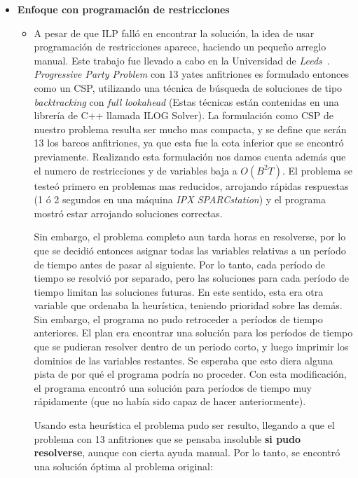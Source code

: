 \documentclass[letter, 10pt]{article}
\begin{document}
\begin{itemize}
\item \textbf{Enfoque con programación de restricciones}
\begin{itemize}
\item A pesar de que ILP falló en encontrar la solución, la idea de usar programación de restricciones aparece, haciendo un pequeño arreglo manual. Este trabajo fue llevado a cabo en la Universidad de \textit{Leeds}~\cite{Smith1996}. \textit{Progressive Party Problem} con 13 yates anfitriones es formulado entonces como un CSP, utilizando una técnica de búsqueda de soluciones de tipo \textit{backtracking} con \textit{full lookahead} (Estas técnicas están contenidas en una librería de C++ llamada ILOG Solver).
La formulación como CSP de nuestro problema resulta ser mucho mas compacta, y se define que serán 13 los barcos anfitriones, ya que esta fue la cota inferior que se encontró previamente. Realizando esta formulación nos damos cuenta además que el numero de restricciones y de variables baja a $O(B^2T)$. El problema se testeó primero en problemas mas reducidos, arrojando rápidas respuestas (1 ó 2 segundos en una máquina \textit{IPX SPARCstation}) y el programa mostró estar arrojando soluciones correctas.

Sin embargo, el problema completo aun  tarda horas en resolverse, por lo que se decidió entonces asignar todas las variables relativas a un período de tiempo antes de pasar al siguiente. Por lo tanto, cada período de tiempo se resolvió por separado, pero las soluciones para cada período de tiempo limitan las soluciones futuras. En este sentido, esta era otra variable que ordenaba la heurística, teniendo prioridad sobre las demás. Sin embargo, el programa no pudo retroceder a períodos de tiempo anteriores. El plan era encontrar una solución para los períodos de tiempo que se pudieran resolver dentro de un periodo corto, y luego imprimir los dominios de las variables restantes. Se esperaba que esto diera alguna pista de por qué el programa podría no proceder. Con esta modificación, el programa encontró una solución para períodos de tiempo muy rápidamente (que no había sido capaz de hacer anteriormente).

Usando esta heurística el problema pudo ser resulto, llegando a que el problema con 13 anfitriones que se pensaba insoluble \textbf{si pudo resolverse}, aunque con cierta ayuda manual. Por lo tanto, se encontró una solución óptima al problema original:


\end{itemize}
\end{itemize}
\end{document}
